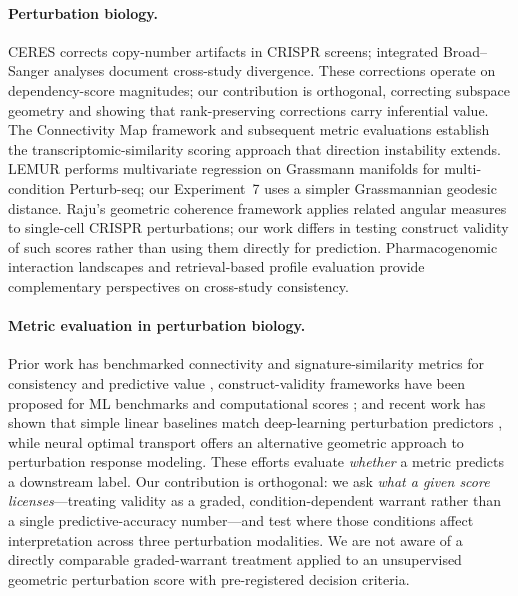 \documentclass[11pt]{article}
\begin{document}
\paragraph{Perturbation biology.}
CERES \citep{meyers2017ceres} corrects copy-number artifacts in CRISPR
screens; integrated Broad--Sanger analyses \citep{pacini2021integrated}
document cross-study divergence. These corrections operate on
dependency-score magnitudes; our contribution is orthogonal, correcting
subspace geometry and showing that rank-preserving corrections carry
inferential value. The Connectivity Map framework
\citep{subramanian2017next,lamb2006connectivity} and subsequent metric
evaluations \citep{li2020comprehensive} establish the
transcriptomic-similarity scoring approach that direction instability extends.
LEMUR \citep{ahlmanneltze2025lemur} performs multivariate regression on
Grassmann manifolds for multi-condition Perturb-seq; our Experiment~7 uses
a simpler Grassmannian geodesic distance. Raju's geometric coherence
framework \citep{raju2026shesha} applies related angular measures to
single-cell CRISPR perturbations; our work differs in testing construct
validity of such scores rather than using them directly for prediction.
Pharmacogenomic interaction landscapes \citep{iorio2018unsupervised}
and retrieval-based profile evaluation \citep{kalinin2025versatile}
provide complementary perspectives on cross-study consistency.

\paragraph{Metric evaluation in perturbation biology.}
Prior work has benchmarked connectivity and signature-similarity metrics
for consistency and predictive value
\citep{subramanian2017next,li2020comprehensive,napolitano2021reconciling},
construct-validity
frameworks have been proposed for ML benchmarks and computational scores
\citep{freiesleben2025benchmarking,watson2025measuring}; and recent work
has shown that simple linear baselines match deep-learning perturbation
predictors \citep{ahlmanneltze2025baseline}, while neural optimal
transport \citep{bunne2023cellot} offers an alternative geometric
approach to perturbation response modeling. These efforts
evaluate \emph{whether} a metric predicts a downstream label. Our
contribution is orthogonal: we ask \emph{what a given score licenses}---treating
validity as a graded, condition-dependent warrant rather than a single
predictive-accuracy number---and test where those conditions affect
interpretation across three perturbation modalities. We are not aware of
a directly comparable graded-warrant treatment applied to an unsupervised
geometric perturbation score with pre-registered decision criteria.
\end{document}
